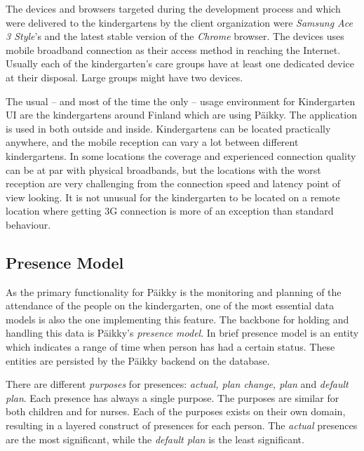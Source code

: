 The devices and browsers targeted during the development process and which  were delivered to the kindergartens by the client organization were \textit{Samsung Ace 3 Style}'s and the latest stable version of the \textit{Chrome} browser. The devices uses mobile broadband connection as their access method in reaching the Internet. Usually each of the kindergarten's care groups have at least one dedicated device at their disposal. Large groups might have two devices. 

The usual – and most of the time the only – usage environment for Kindergarten UI are the kindergartens around Finland which are using Päikky. The application is used in both outside and inside. Kindergartens can be located practically anywhere, and the mobile reception can vary a lot between different kindergartens. In some locations the coverage and experienced connection quality can be at par with physical broadbands, but the locations with the worst reception are very challenging from the connection speed and latency point of view looking. It is not unusual for the kindergarten to be located on a remote location where getting 3G connection is more of an exception than standard behaviour. %


\subsection{Presence Model}


As the primary functionality for Päikky is the monitoring and planning of the attendance of the people on the kindergarten, one of the most essential data models is also the one implementing this feature. The backbone for holding and handling this data is Päikky's \textit{presence model}. In brief presence model is an entity which indicates a range of time when person has had a certain status. These entities are persisted by the Päikky backend on the database.

There are different \textit{purposes} for presences: \textit{actual, plan change, plan} and \textit{default plan}. Each presence has always a single purpose. The purposes are similar for both children and for nurses. Each of the purposes exists on their own domain, resulting in a layered construct of presences for each person. The \textit{actual} presences are the most significant, while the \textit{default plan} is the least significant. %

